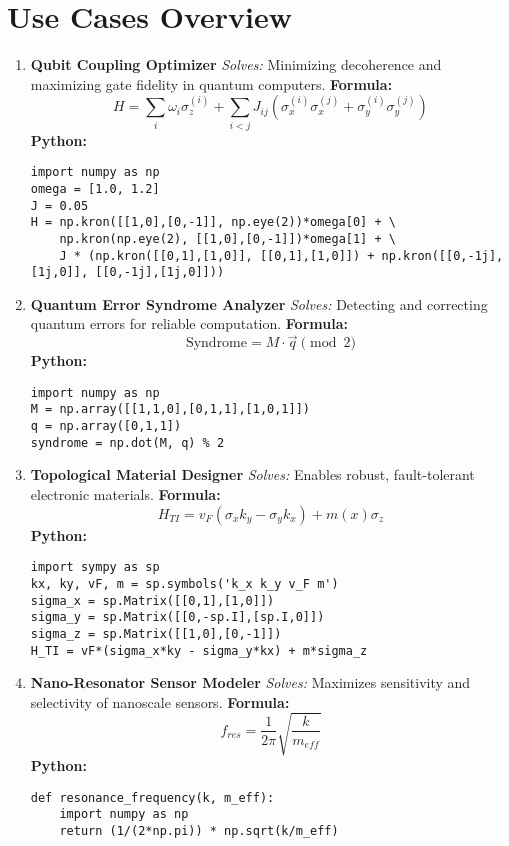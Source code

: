 \documentclass[12pt]{article}
\begin{document}
\clearpage
\section*{Use Cases Overview}

\begin{enumerate}[leftmargin=0pt, label=\textbf{\arabic*.}, itemsep=3em]

\item \textbf{Qubit Coupling Optimizer}  
\textit{Solves:} Minimizing decoherence and maximizing gate fidelity in quantum computers.  
\textbf{Formula:}  
\[
H = \sum_i \omega_i \sigma_z^{(i)} + \sum_{i<j} J_{ij} (\sigma_x^{(i)}\sigma_x^{(j)} + \sigma_y^{(i)}\sigma_y^{(j)})
\]  
\textbf{Python:}
\begin{lstlisting}
import numpy as np
omega = [1.0, 1.2]
J = 0.05
H = np.kron([[1,0],[0,-1]], np.eye(2))*omega[0] + \
    np.kron(np.eye(2), [[1,0],[0,-1]])*omega[1] + \
    J * (np.kron([[0,1],[1,0]], [[0,1],[1,0]]) + np.kron([[0,-1j],[1j,0]], [[0,-1j],[1j,0]]))
\end{lstlisting}

\item \textbf{Quantum Error Syndrome Analyzer}  
\textit{Solves:} Detecting and correcting quantum errors for reliable computation.  
\textbf{Formula:}  
\[
\text{Syndrome} = M \cdot \vec{q} \pmod{2}
\]  
\textbf{Python:}
\begin{lstlisting}
import numpy as np
M = np.array([[1,1,0],[0,1,1],[1,0,1]])
q = np.array([0,1,1])
syndrome = np.dot(M, q) % 2
\end{lstlisting}

\item \textbf{Topological Material Designer}  
\textit{Solves:} Enables robust, fault-tolerant electronic materials.  
\textbf{Formula:}  
\[
H_{TI} = v_F (\sigma_x k_y - \sigma_y k_x) + m(x) \sigma_z
\]  
\textbf{Python:}
\begin{lstlisting}
import sympy as sp
kx, ky, vF, m = sp.symbols('k_x k_y v_F m')
sigma_x = sp.Matrix([[0,1],[1,0]])
sigma_y = sp.Matrix([[0,-sp.I],[sp.I,0]])
sigma_z = sp.Matrix([[1,0],[0,-1]])
H_TI = vF*(sigma_x*ky - sigma_y*kx) + m*sigma_z
\end{lstlisting}

\item \textbf{Nano-Resonator Sensor Modeler}  
\textit{Solves:} Maximizes sensitivity and selectivity of nanoscale sensors.  
\textbf{Formula:}  
\[
f_{res} = \frac{1}{2\pi} \sqrt{\frac{k}{m_{eff}}}
\]  
\textbf{Python:}
\begin{lstlisting}
def resonance_frequency(k, m_eff):
    import numpy as np
    return (1/(2*np.pi)) * np.sqrt(k/m_eff)
\end{lstlisting}


\end{enumerate}
\end{document}
